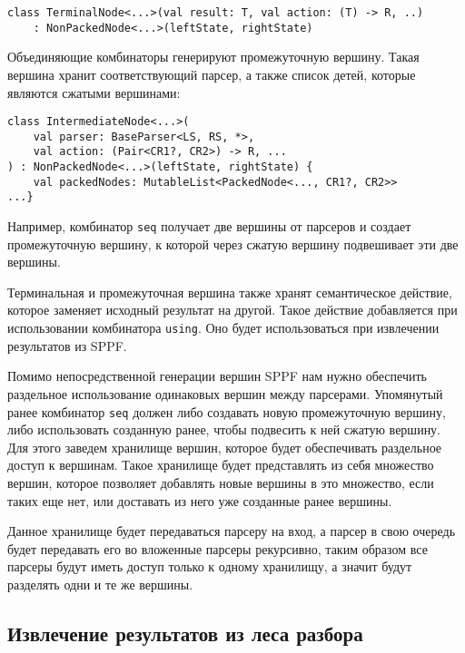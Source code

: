 \begin{nobreaks}
    \begin{lstlisting}
class TerminalNode<...>(val result: T, val action: (T) -> R, ..)  
    : NonPackedNode<...>(leftState, rightState)
\end{lstlisting}
\end{nobreaks}

Объединяющие комбинаторы генерируют промежуточную вершину. Такая вершина хранит соответствующий парсер, а также список детей, которые являются сжатыми вершинами:

\begin{nobreaks}
\begin{lstlisting}
class IntermediateNode<...>(
    val parser: BaseParser<LS, RS, *>, 
    val action: (Pair<CR1?, CR2>) -> R, ...
) : NonPackedNode<...>(leftState, rightState) {
    val packedNodes: MutableList<PackedNode<..., CR1?, CR2>>
...}
\end{lstlisting}
\end{nobreaks}

Например, комбинатор \texttt{seq} получает две вершины от парсеров и создает промежуточную вершину, к которой через сжатую вершину подвешивает эти две вершины. 

Терминальная и промежуточная вершина также хранят семантическое действие, которое заменяет исходный результат на другой. Такое действие добавляется при использовании комбинатора \texttt{using}. Оно будет использоваться при извлечении результатов из SPPF.

Помимо непосредственной генерации вершин SPPF нам нужно обеспечить раздельное использование одинаковых вершин между парсерами. Упомянутый ранее комбинатор \texttt{seq} должен либо создавать новую промежуточную вершину, либо использовать созданную ранее, чтобы подвесить к ней сжатую вершину. Для этого заведем хранилище вершин, которое будет обеспечивать раздельное доступ к вершинам. Такое хранилище будет представлять из себя множество вершин, которое позволяет добавлять новые вершины в это множество, если таких еще нет, или доставать из него уже созданные ранее вершины. 

Данное хранилище будет передаваться парсеру на вход, а парсер в свою очередь будет передавать его во вложенные парсеры рекурсивно, таким образом все парсеры будут иметь доступ только к одному хранилищу, а значит будут разделять одни и те же вершины. 

\subsection{Извлечение результатов из леса разбора}

